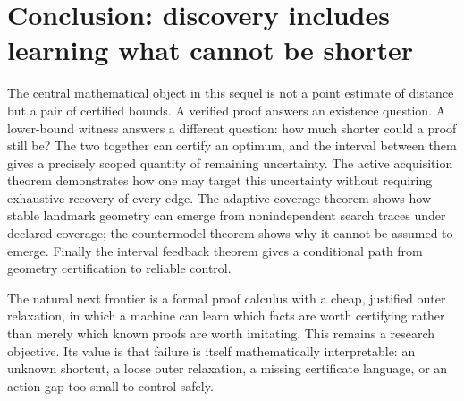 \documentclass[11pt]{article}
\theoremstyle{definition}\newtheorem{definition}[theorem]{Definition}\newtheorem{example}[theorem]{Example}\newtheorem{conjecture}[theorem]{Conjecture}
\begin{document}
\section{Conclusion: discovery includes learning what cannot be shorter}
The central mathematical object in this sequel is not a point estimate of distance but a pair of certified bounds. A verified proof answers an existence question. A lower-bound witness answers a different question: how much shorter could a proof still be? The two together can certify an optimum, and the interval between them gives a precisely scoped quantity of remaining uncertainty. The active acquisition theorem demonstrates how one may target this uncertainty without requiring exhaustive recovery of every edge. The adaptive coverage theorem shows how stable landmark geometry can emerge from nonindependent search traces under declared coverage; the countermodel theorem shows why it cannot be assumed to emerge. Finally the interval feedback theorem gives a conditional path from geometry certification to reliable control.

The natural next frontier is a formal proof calculus with a cheap, justified outer relaxation, in which a machine can learn which facts are worth certifying rather than merely which known proofs are worth imitating. This remains a research objective. Its value is that failure is itself mathematically interpretable: an unknown shortcut, a loose outer relaxation, a missing certificate language, or an action gap too small to control safely.
\end{document}
